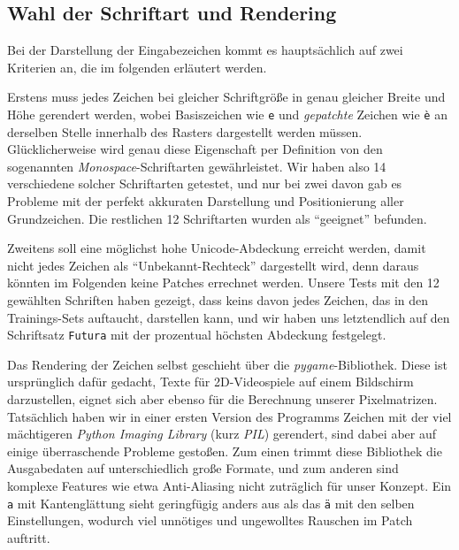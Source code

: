 \documentclass[11pt,a4paper]{article}
\begin{document}
\subsection{Wahl der Schriftart und Rendering}
Bei der Darstellung der Eingabezeichen kommt es hauptsächlich auf zwei Kriterien an, die im folgenden erläutert werden.

Erstens muss jedes Zeichen bei gleicher Schriftgröße in genau gleicher Breite und Höhe gerendert werden, wobei Basiszeichen wie \texttt{e} und \textit{gepatchte} Zeichen wie \texttt{è} an derselben Stelle innerhalb des Rasters dargestellt werden müssen.
Glücklicherweise wird genau diese Eigenschaft per Definition von den sogenannten \textit{Monospace}-Schriftarten gewährleistet. Wir haben also 14 verschiedene solcher Schriftarten getestet, und nur bei zwei davon gab es Probleme mit der perfekt akkuraten Darstellung und Positionierung aller Grundzeichen. Die restlichen 12 Schriftarten wurden als \enquote{geeignet} befunden.

Zweitens soll eine möglichst hohe Unicode-Abdeckung erreicht werden, damit nicht jedes Zeichen als \enquote{Unbekannt-Rechteck} dargestellt wird, denn daraus könnten im Folgenden keine Patches errechnet werden. Unsere Tests mit den 12 gewählten Schriften haben gezeigt, dass keins davon jedes Zeichen, das in den Trainings-Sets auftaucht, darstellen kann, und wir haben uns letztendlich auf den Schriftsatz \texttt{Futura} mit der prozentual höchsten Abdeckung festgelegt.

Das Rendering der Zeichen selbst geschieht über die \textit{pygame}-Bibliothek. Diese ist ursprünglich dafür gedacht, Texte für 2D-Videospiele auf einem Bildschirm darzustellen, eignet sich aber ebenso für die Berechnung unserer Pixelmatrizen. Tatsächlich haben wir in einer ersten Version des Programms Zeichen mit der viel mächtigeren \textit{Python Imaging Library} (kurz \textit{PIL}) gerendert, sind dabei aber auf einige überraschende Probleme gestoßen. Zum einen trimmt diese Bibliothek die Ausgabedaten auf unterschiedlich große Formate, und zum anderen sind komplexe Features wie etwa Anti-Aliasing nicht zuträglich für unser Konzept. Ein \texttt{a} mit Kantenglättung sieht geringfügig anders aus als das \texttt{ä} mit den selben Einstellungen, wodurch viel unnötiges und ungewolltes Rauschen im Patch auftritt.
\end{document}
